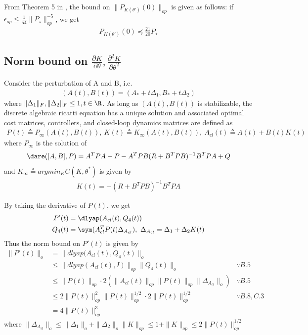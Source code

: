 From Theorem 5 in \citep{simchowitz2020naive}, the bound on $\|P_{K(\theta')}(0)\|_{op}$ is given as follows: if $\epsilon_{op}\leq\frac{1}{54}\|P_\star\|_{op}^{-5}$, we get
\begin{align}
    P_{K(\theta')}(0) \preceq \frac{21}{20}P_\star  \label{eq:PK bound}
\end{align}



\subsection{Norm bound on $\frac{\partial K}{\partial \theta}, \frac{\partial^2 K}{\partial \theta^2}$}
Consider the perturbation of A and B, i.e.
\begin{align*}
    (A(t), B(t)) = (A_* + t\Delta_1, B_* + t\Delta_2)
\end{align*}
where $\|\Delta_1\|_F, \|\Delta_2\|_F\leq1, t\in\R$.
As long as $(A(t), B(t))$ is stabilizable, the discrete algebraic ricatti equation has a unique solution and associated optimal cost matrices, controllers, and closed-loop dynamics matrices are defined as
\begin{align*}
    P(t) \triangleq P_{\infty}(A(t), B(t)), ~ K(t) \triangleq K_{\infty}(A(t), B(t)), ~ A_{cl}(t) \triangleq A(t) + B(t)K(t)
\end{align*}
where $P_{\infty}$ is the solution of
\begin{align*}
    \dare([A, B], P) = A^TPA - P - A^TPB(R + B^TPB)^{-1}B^TPA + Q 
\end{align*}
and $K_{\infty} \triangleq argmin_{K}C(K, \theta^*)$ is given by
\begin{align}
    K(t) = -(R + B^TPB)^{-1}B^TPA \label{eq:K_inf}
\end{align}

By taking the derivative of $P(t)$, we get
\begin{align*}
    P'(t) &= \dlyap(A_{cl}(t), Q_4(t)) \\
    Q_4(t) &= \sym(A_{cl}^TP(t)\Delta_{A_{cl}}), ~ \Delta_{A_{cl}} = \Delta_1 + \Delta_2K(t)
\end{align*}
Thus the norm bound on $P'(t)$ is given by
\begin{align*}
    \|P'(t)\|_o &= \|dlyap(A_{cl}(t), Q_4(t)\|_o 
    \\
    &\leq \|dlyap(A_{cl}(t), I)\|_{op}\|Q_4(t)\|_o &\because  B.5
    \\
    &\leq \|P(t)\|_{op}\cdot2(\|A_{cl}(t)\|_{op}\|P(t)\|_{op}\|\Delta_{A_{cl}}\|_o) &\because B.5\\
    &\leq 2\|P(t)\|^2_{op}\|P(t)\|^{1/2}_{op}\cdot2\|P(t)\|_{op}^{1/2}&\because  B.8, C.3\\
    &= 4\|P(t)\|^3_{op}
\end{align*}
where $\|\Delta_{A_{cl}}\|_o \leq \|\Delta_1\|_o + \|\Delta_2\|_o\|K\|_{op}\leq
1 + \|K\|_{op} \leq 2\|P(t)\|_{op}^{1/2}$

